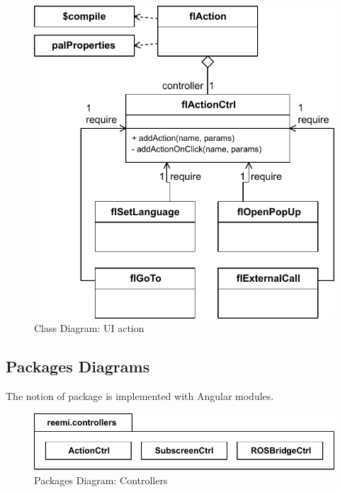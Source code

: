 \begin{figure}[htb]
    \centering
    \includegraphics{figures/design-class-action.pdf}
    \caption{Class Diagram: UI action}
    \label{fig:class-action}
\end{figure}


\FloatBarrier
\subsection{Packages Diagrams}
The notion of package is implemented with Angular modules.

\begin{figure}[htb]
    \centering
    \includegraphics{figures/design-package-controllers.pdf}
    \caption{Packages Diagram: Controllers}
    \label{fig:pkg-controllers}
\end{figure}

